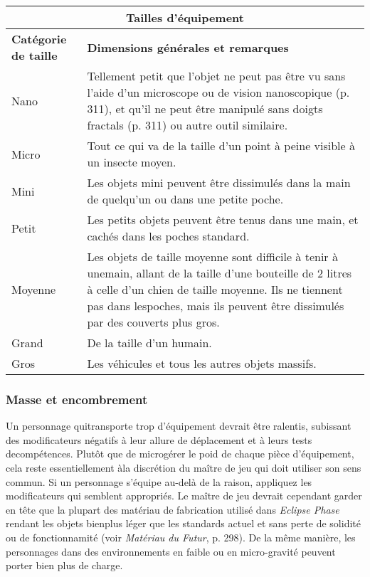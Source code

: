 \begin{table} \begin{tabularx}{\textwidth}{|l|X|} \hline

\multicolumn{2}{|c|}{\textbf{Tailles d'équipement}}	\\ \hline

\textbf{Catégorie de taille}	&\textbf{Dimensions générales et remarques} \\ Nano	&Tellement petit que l'objet ne peut pas être vu sans l'aide d'un microscope ou de vision nanoscopique (p. 311), et qu'il ne peut être manipulé sans doigts fractals (p. 311) ou autre outil similaire. \\ \hline

Micro	&Tout ce qui va de la taille d'un point à peine visible à un insecte moyen. \\ \hline

Mini	&Les objets mini peuvent être dissimulés dans la main de quelqu'un ou dans une petite poche. \\ \hline

Petit	&Les petits objets peuvent être tenus dans une main, et cachés dans les poches standard.\\ \hline

Moyenne	&Les objets de taille moyenne sont difficile à tenir à unemain, allant de la taille d'une bouteille de 2 litres à celle d'un chien de taille moyenne. Ils ne tiennent pas dans lespoches, mais ils peuvent être dissimulés par des couverts plus gros. \\ \hline

Grand	&De la taille d'un humain. \\ \hline

Gros	&Les véhicules et tous les autres objets massifs. \\ \hline

\end{tabularx} \label{tab:gear-sizes} \end{table} 

\subsubsection{Masse et encombrement} 

Un personnage quitransporte trop d'équipement devrait être ralentis, subissant des modificateurs négatifs à leur allure de déplacement et à leurs tests decompétences. Plutôt que de microgérer le poid de chaque pièce d'équipement, cela reste essentiellement àla discrétion du maître de jeu qui doit utiliser son sens commun. Si un personnage s'équipe au-delà de la raison, appliquez les modificateurs qui semblent appropriés. Le maître de jeu devrait cependant garder en tête que la plupart des matériau de fabrication utilisé dans \emph{Eclipse Phase} rendant les objets bienplus léger que les standards actuel et sans perte de solidité ou de fonctionnamité (voir \emph{Matériau du Futur}, p. 298). De la même manière, les personnages dans des environnements en faible ou en micro-gravité peuvent porter bien plus de charge. 

